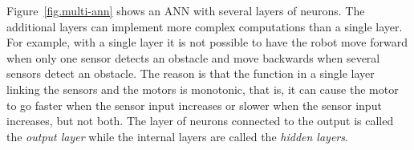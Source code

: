 
Figure~\ref{fig.multi-ann} shows an ANN with several layers of neurons. The additional layers can implement more complex computations than a single layer. For example, with a single layer it is not possible to have the robot move forward when only one sensor detects an obstacle and move backwards when several sensors detect an obstacle. The reason is that the function in a single layer linking the sensors and the motors is monotonic, that is, it can cause the motor to go faster when the sensor input increases or slower when the sensor input increases, but not both. The layer of neurons connected to the output is called the \textit{output layer} while the internal layers are called the \emph{hidden layers}.


